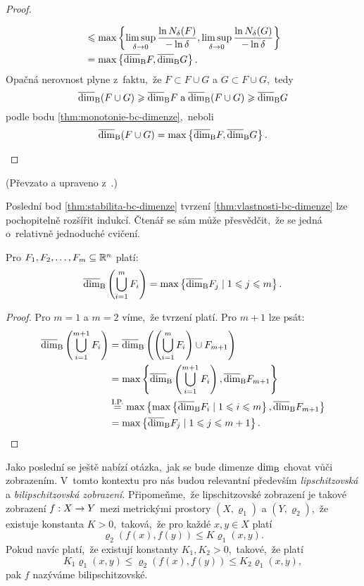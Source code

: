 \begin{proof}
\begin{enumerate}[label=\textit{(\roman*)}]
\begin{align*}
            &\leqslant\max\left\{\limsup_{\delta\to 0}\dfrac{\ln{N_\delta(F)}}{-\ln{\delta}},\limsup_{\delta\to 0}\dfrac{\ln{N_\delta(G)}}{-\ln{\delta}}\right\}\\
            &=\max\left\{\overline{\dim}_\textup{B}{F},\overline{\dim}_\textup{B}{G}\right\}.
        \end{align*}
        Opačná nerovnost plyne z~faktu,~že $F\subset F\cup G$ a $G\subset F\cup G$,~tedy
        \[\overline{\dim}_\textup{B}(F\cup G)\geqslant\overline{\dim}_\textup{B}{F}\;\text{a}\;\overline{\dim}_\textup{B}(F\cup G)\geqslant\overline{\dim}_\textup{B}{G}\]
        podle bodu \ref{thm:monotonie-bc-dimenze},~neboli
        \[\overline{\dim}_\textup{B}(F\cup G)=\max\left\{\overline{\dim}_\textup{B}{F},\overline{\dim}_\textup{B}{G}\right\}.\]
    \end{enumerate}
\end{proof}
(Převzato a upraveno z~\citep[str. 35]{Falconer2014}.)

Poslední bod \ref{thm:stabilita-bc-dimenze} tvrzení \ref{thm:vlastnosti-bc-dimenze} lze pochopitelně rozšířit indukcí. Čtenář se sám může přesvědčit,~že se jedná o~relativně jednoduché cvičení.
\begin{corollary}\label{cor:stabilita-bc-dimenze-obecne}
    Pro $F_1,F_2,\ldots,F_m\subseteq\mathbb{R}^n$ platí:
    \[\overline{\dim}_\textup{B}\left(\bigcup_{i=1}^m F_i\right)=\max\left\{\overline{\dim}_\textup{B}{F_j}\mid 1\leqslant j\leqslant m\right\}.\]
\end{corollary}
\begin{proof}
    Pro $m=1$ a $m=2$ víme,~že tvrzení platí. Pro $m+1$ lze psát:
    \begin{align*}
        \overline{\dim}_\textup{B}\left(\bigcup_{i=1}^{m+1}F_i\right)&=\overline{\dim}_\textup{B}\left(\left(\bigcup_{i=1}^{m}F_i\right)\cup F_{m+1}\right)\\
        &=\max\left\{\overline{\dim}_\textup{B}\left(\bigcup_{i=1}^{m+1}F_i\right),\overline{\dim}_\textup{B}{F_{m+1}}\right\}\\
        &\stackrel{\text{I.P.}}{=}\max\left\{\max\left\{\overline{\dim}_\textup{B}{F_i}\mid 1\leqslant i\leqslant m\right\},\overline{\dim}_\textup{B}{F_{m+1}}\right\}\\
        &=\max\left\{\overline{\dim}_\textup{B}{F_j}\mid 1\leqslant j\leqslant m+1\right\}.
    \end{align*}
\end{proof}

Jako poslední se ještě nabízí otázka,~jak se bude dimenze $\operatorname{dim_B}$ chovat vůči zobrazením. V~tomto kontextu pro nás budou relevantní především \emph{lipschitzovská} a \emph{bilipschitzovská zobrazení}. Připomeňme,~že lipschitzovské zobrazení je takové zobrazení $f:X \rightarrow Y$ mezi metrickými prostory $(X,\varrho_1)$ a $(Y,\varrho_2)$,~že existuje konstanta $K>0$,~taková,~že pro každé $x,y\in X$ platí
\[\varrho_2(f(x),f(y))\leqslant K\varrho_1(x,y).\]
Pokud navíc platí,~že existují konstanty $K_1,K_2>0$,~takové,~že platí
\[K_1\varrho_1(x,y)\leqslant\varrho_2(f(x),f(y))\leqslant K_2\varrho_1(x,y),\]
pak $f$ nazýváme bilipschitzovské.

